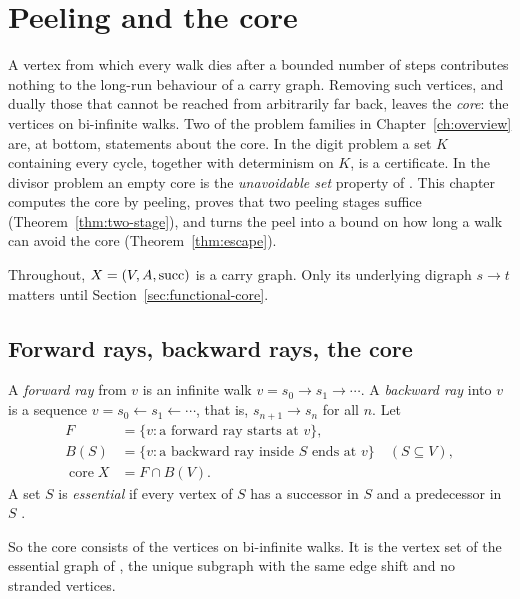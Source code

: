 \chapter{Peeling and the core}\label{ch:core}

A vertex from which every walk dies after a bounded number of steps contributes nothing to
the long-run behaviour of a carry graph. Removing such vertices, and dually those that cannot
be reached from arbitrarily far back, leaves the \emph{core}: the vertices on bi-infinite walks.
Two of the problem families in Chapter~\ref{ch:overview} are, at bottom, statements about the
core. In the digit problem a set \(K\) containing every cycle, together with determinism on
\(K\), is a certificate. In the divisor problem an empty core is the \emph{unavoidable set}
property of \cite{DubOst06}. This chapter computes the core by peeling, proves that two peeling
stages suffice (Theorem~\ref{thm:two-stage}), and turns the peel into a bound on how long a
walk can avoid the core (Theorem~\ref{thm:escape}).

Throughout, \(X=(V,A,\operatorname{succ})\) is a carry graph. Only its underlying digraph \(s\to t\) matters
until Section~\ref{sec:functional-core}.

\section{Forward rays, backward rays, the core}

\begin{definition}\label{def:core}
A \emph{forward ray} from \(v\) is an infinite walk \(v=s_0\to s_1\to\cdots\). A \emph{backward
ray} into \(v\) is a sequence \(v=s_0\leftarrow s_1\leftarrow\cdots\), that is, \(s_{n+1}\to s_n\)
for all \(n\). Let
\begin{align*}
  F&=\{v : \text{a forward ray starts at } v\},\\
  B(S)&=\{v : \text{a backward ray inside } S \text{ ends at } v\}\quad(S\subseteq V),\\
  \operatorname{core}X&=F\cap B(V).
\end{align*}
A set \(S\) is \emph{essential} if every vertex of \(S\) has a successor in \(S\) and a
predecessor in \(S\) \cite[Def.~2.2.9]{LM95}.
\end{definition}

So the core consists of the vertices on bi-infinite walks. It is the vertex set of the
essential graph of \cite[§2.2]{LM95}, the unique subgraph with the same edge shift and no
stranded vertices.

